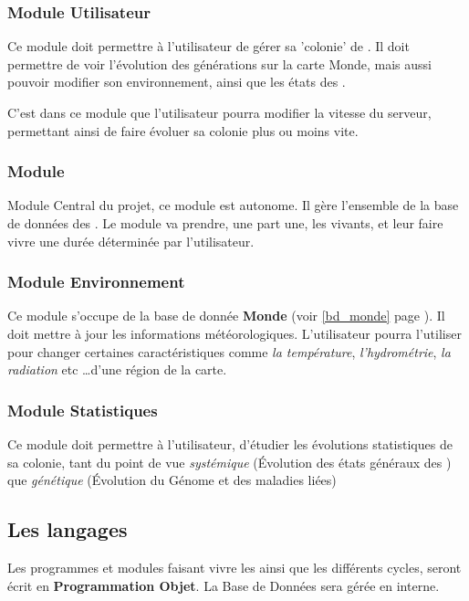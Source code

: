 \documentclass[french]{report}
\newlength{\du}\fi
\begin{document}
\subsubsection{Module Utilisateur}
Ce module doit permettre à l'utilisateur de gérer sa 'colonie' de \CoCiX. Il doit permettre de voir l'évolution des générations sur la carte Monde, mais aussi pouvoir modifier son environnement, ainsi que les états des \CoCiX.

C'est dans ce module que l'utilisateur pourra modifier la vitesse du serveur, permettant ainsi de faire évoluer sa colonie plus ou moins vite.

\subsubsection{Module \CoCiX}
Module Central du projet, ce module est autonome. Il gère l'ensemble de la base de données des \CoCiX. Le module va prendre, une part une, les \CoCiX vivants, et leur faire vivre une durée déterminée par l'utilisateur.
\subsubsection{Module Environnement}
Ce module s'occupe de la base de donnée \textbf{Monde} (voir \ref{bd_monde} page \pageref{bd_monde}). Il doit mettre à jour les informations météorologiques. L'utilisateur pourra l'utiliser pour changer certaines caractéristiques comme \textit{la température}, \textit{l'hydrométrie}, \textit{la radiation} etc \dots d'une région de la carte.

\subsubsection{Module Statistiques}
Ce module doit permettre à l'utilisateur, d'étudier les évolutions statistiques de sa colonie, tant du point de vue \emph{systémique} (Évolution des états généraux des \CoCiX) que \emph{génétique} (Évolution du Génome et des maladies liées)

\subsection{Les langages}
Les programmes et modules faisant vivre les \CoCiX ainsi que les différents cycles, seront écrit en \textbf{Programmation Objet}. La Base de Données sera gérée en interne.

\end{document}
